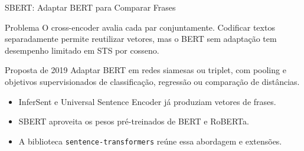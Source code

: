 \documentclass[aspectratio=169, xcolor=dvipsnames]{beamer}
\begin{document}
  \begin{frame}{SBERT: Adaptar BERT para Comparar Frases}
    \begin{block}{Problema}
      O cross-encoder avalia cada par conjuntamente. Codificar textos
      separadamente permite reutilizar vetores, mas o BERT sem adaptação
      tem desempenho limitado em STS por cosseno.
    \end{block}
    \begin{block}{Proposta de 2019}
      Adaptar BERT em redes siamesas ou triplet, com pooling e objetivos
      supervisionados de classificação, regressão ou comparação de distâncias.
    \end{block}
    \begin{itemize}
      \item InferSent e Universal Sentence Encoder já produziam vetores de frases.
      \item SBERT aproveita os pesos pré-treinados de BERT e RoBERTa.
      \item A biblioteca \texttt{sentence-transformers} reúne essa abordagem e extensões.
    \end{itemize}
  \end{frame}
\end{document}
